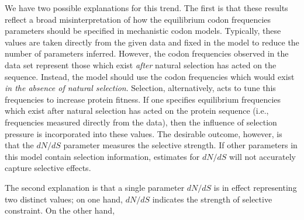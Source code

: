 \documentclass[11pt]{article}
\begin{document}

We have two possible explanations for this trend.
The first is that these results reflect a broad misinterpretation of how the equilibrium codon frequencies parameters should be specified in mechanistic codon models. Typically, these values are taken directly from the given data and fixed in the model to reduce the number of parameters inferred. However, the codon frequencies observed in the data set represent those which exist \textit{after} natural selection has acted on the sequence. Instead, the model should use the codon frequencies which would exist \textit{in the absence of natural selection}. Selection, alternatively, acts to tune this frequencies to increase protein fitness. If one specifies equilibrium frequencies which exist after natural selection has acted on the protein sequence (i.e., frequencies measured directly from the data), then the influence of selection pressure is incorporated into these values. The desirable outcome, however, is that the $dN/dS$ parameter measures the selective strength. If other parameters in this model contain selection information, estimates for $dN/dS$ will not accurately capture selective effects.

The second explanation is that a single parameter $dN/dS$ is in effect representing two distinct values; on one hand, $dN/dS$ indicates the strength of selective constraint. On the other hand,  
\end{document}
